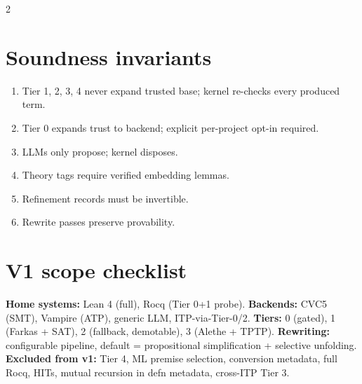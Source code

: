 \documentclass[10pt,letterpaper]{article}
\begin{document}
\begin{multicols}{2}
\section{Soundness invariants}

\begin{enumerate}
  \item Tier 1, 2, 3, 4 never expand trusted base; kernel re-checks every produced term.
  \item Tier 0 expands trust to backend; explicit per-project opt-in required.
  \item LLMs only propose; kernel disposes.
  \item Theory tags require verified embedding lemmas.
  \item Refinement records must be invertible.
  \item Rewrite passes preserve provability.
\end{enumerate}

\end{multicols}

\section{V1 scope checklist}

\noindent
\textbf{Home systems:} Lean 4 (full), Rocq (Tier 0+1 probe).
\quad
\textbf{Backends:} CVC5 (SMT), Vampire (ATP), generic LLM, ITP-via-Tier-0/2.
\quad
\textbf{Tiers:} 0 (gated), 1 (Farkas + SAT), 2 (fallback, demotable), 3 (Alethe + TPTP).
\quad
\textbf{Rewriting:} configurable pipeline, default = propositional simplification + selective unfolding.
\quad
\textbf{Excluded from v1:} Tier 4, ML premise selection, conversion metadata, full Rocq, HITs, mutual recursion in defn metadata, cross-ITP Tier 3.
\end{document}
